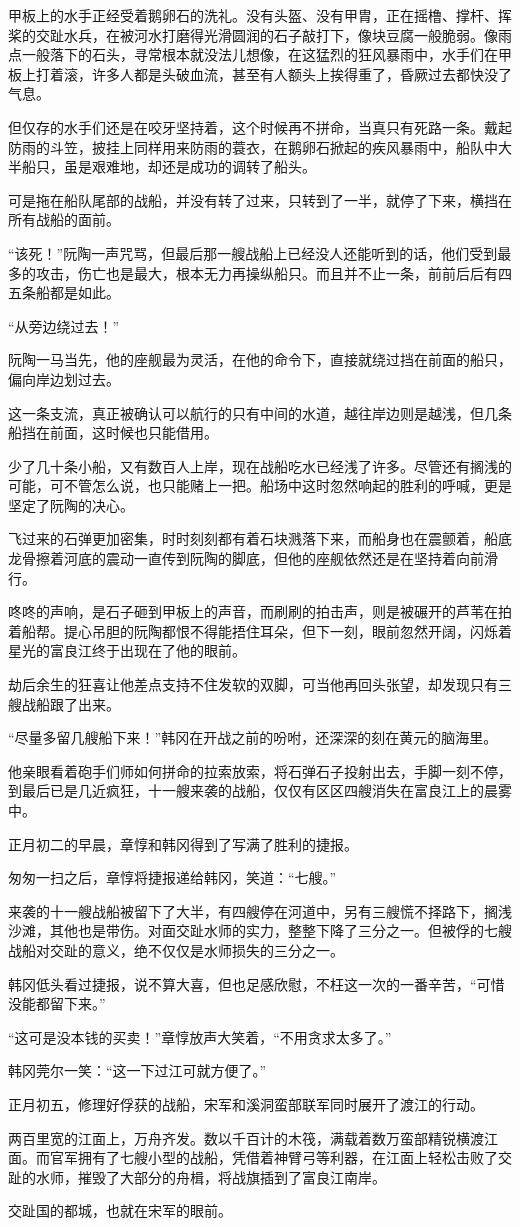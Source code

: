甲板上的水手正经受着鹅卵石的洗礼。没有头盔、没有甲胄，正在摇橹、撑杆、挥桨的交趾水兵，在被河水打磨得光滑圆润的石子敲打下，像块豆腐一般脆弱。像雨点一般落下的石头，寻常根本就没法儿想像，在这猛烈的狂风暴雨中，水手们在甲板上打着滚，许多人都是头破血流，甚至有人额头上挨得重了，昏厥过去都快没了气息。

但仅存的水手们还是在咬牙坚持着，这个时候再不拼命，当真只有死路一条。戴起防雨的斗笠，披挂上同样用来防雨的蓑衣，在鹅卵石掀起的疾风暴雨中，船队中大半船只，虽是艰难地，却还是成功的调转了船头。

可是拖在船队尾部的战船，并没有转了过来，只转到了一半，就停了下来，横挡在所有战船的面前。

“该死！”阮陶一声咒骂，但最后那一艘战船上已经没人还能听到的话，他们受到最多的攻击，伤亡也是最大，根本无力再操纵船只。而且并不止一条，前前后后有四五条船都是如此。

“从旁边绕过去！”

阮陶一马当先，他的座舰最为灵活，在他的命令下，直接就绕过挡在前面的船只，偏向岸边划过去。

这一条支流，真正被确认可以航行的只有中间的水道，越往岸边则是越浅，但几条船挡在前面，这时候也只能借用。

少了几十条小船，又有数百人上岸，现在战船吃水已经浅了许多。尽管还有搁浅的可能，可不管怎么说，也只能赌上一把。船场中这时忽然响起的胜利的呼喊，更是坚定了阮陶的决心。

飞过来的石弹更加密集，时时刻刻都有着石块溅落下来，而船身也在震颤着，船底龙骨擦着河底的震动一直传到阮陶的脚底，但他的座舰依然还是在坚持着向前滑行。

咚咚的声响，是石子砸到甲板上的声音，而刷刷的拍击声，则是被碾开的芦苇在拍着船帮。提心吊胆的阮陶都恨不得能捂住耳朵，但下一刻，眼前忽然开阔，闪烁着星光的富良江终于出现在了他的眼前。

劫后余生的狂喜让他差点支持不住发软的双脚，可当他再回头张望，却发现只有三艘战船跟了出来。

“尽量多留几艘船下来！”韩冈在开战之前的吩咐，还深深的刻在黄元的脑海里。

他亲眼看着砲手们师如何拼命的拉索放索，将石弹石子投射出去，手脚一刻不停，到最后已是几近疯狂，十一艘来袭的战船，仅仅有区区四艘消失在富良江上的晨雾中。

正月初二的早晨，章惇和韩冈得到了写满了胜利的捷报。

匆匆一扫之后，章惇将捷报递给韩冈，笑道：“七艘。”

来袭的十一艘战船被留下了大半，有四艘停在河道中，另有三艘慌不择路下，搁浅沙滩，其他也是带伤。对面交趾水师的实力，整整下降了三分之一。但被俘的七艘战船对交趾的意义，绝不仅仅是水师损失的三分之一。

韩冈低头看过捷报，说不算大喜，但也足感欣慰，不枉这一次的一番辛苦，“可惜没能都留下来。”

“这可是没本钱的买卖！”章惇放声大笑着，“不用贪求太多了。”

韩冈莞尔一笑：“这一下过江可就方便了。”

正月初五，修理好俘获的战船，宋军和溪洞蛮部联军同时展开了渡江的行动。

两百里宽的江面上，万舟齐发。数以千百计的木筏，满载着数万蛮部精锐横渡江面。而官军拥有了七艘小型的战船，凭借着神臂弓等利器，在江面上轻松击败了交趾的水师，摧毁了大部分的舟楫，将战旗插到了富良江南岸。

交趾国的都城，也就在宋军的眼前。

